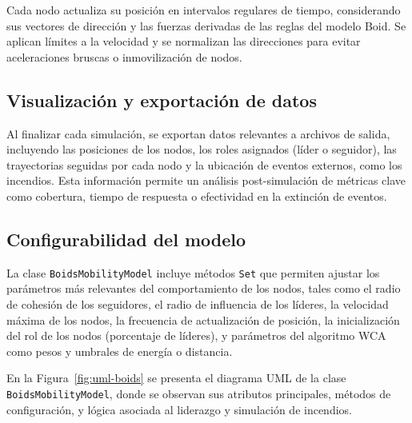 \documentclass{article}
\begin{document}
Cada nodo actualiza su posición en intervalos regulares de tiempo, considerando sus vectores de dirección y las fuerzas derivadas de las reglas del modelo Boid. Se aplican límites a la velocidad y se normalizan las direcciones para evitar aceleraciones bruscas o inmovilización de nodos.

\subsection{Visualización y exportación de datos}

Al finalizar cada simulación, se exportan datos relevantes a archivos de salida, incluyendo las posiciones de los nodos, los roles asignados (líder o seguidor), las trayectorias seguidas por cada nodo y la ubicación de eventos externos, como los incendios.
Esta información permite un análisis post-simulación de métricas clave como cobertura, tiempo de respuesta o efectividad en la extinción de eventos.

\subsection{Configurabilidad del modelo}

La clase \texttt{BoidsMobilityModel} incluye métodos \texttt{Set} que permiten ajustar los parámetros más relevantes del comportamiento de los nodos, tales como el radio de cohesión de los seguidores, el radio de influencia de los líderes, la velocidad máxima de los nodos, la frecuencia de actualización de posición, la inicialización del rol de los nodos (porcentaje de líderes), y parámetros del algoritmo WCA como pesos y umbrales de energía o distancia. 

En la Figura~\ref{fig:uml-boids} se presenta el diagrama UML de la clase \texttt{BoidsMobilityModel}, donde se observan sus atributos principales, métodos de configuración, y lógica asociada al liderazgo y simulación de incendios.
\end{document}
